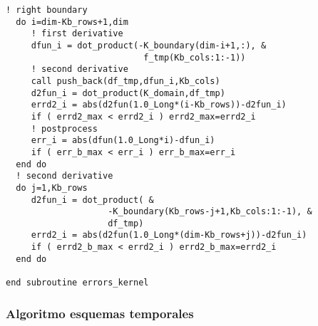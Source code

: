 \documentclass[9pt,technote,twoside,letterpaper,onecolumn]{IEEEtran}
\begin{document}
\begin{multicols}{2}
\begin{lstlisting}[caption={Algoritmo del cálculo de las derivadas},label={lst:opt_alg}]
  ! right boundary
  do i=dim-Kb_rows+1,dim
     ! first derivative
     dfun_i = dot_product(-K_boundary(dim-i+1,:), &
                           f_tmp(Kb_cols:1:-1))
     ! second derivative
     call push_back(df_tmp,dfun_i,Kb_cols)
     d2fun_i = dot_product(K_domain,df_tmp)
     errd2_i = abs(d2fun(1.0_Long*(i-Kb_rows))-d2fun_i)
     if ( errd2_max < errd2_i ) errd2_max=errd2_i
     ! postprocess
     err_i = abs(dfun(1.0_Long*i)-dfun_i)
     if ( err_b_max < err_i ) err_b_max=err_i
  end do
  ! second derivative
  do j=1,Kb_rows
     d2fun_i = dot_product( & 
                    -K_boundary(Kb_rows-j+1,Kb_cols:1:-1), &
                    df_tmp)
     errd2_i = abs(d2fun(1.0_Long*(dim-Kb_rows+j))-d2fun_i)
     if ( errd2_b_max < errd2_i ) errd2_b_max=errd2_i
  end do
    
end subroutine errors_kernel
\end{lstlisting}
\end{multicols}

\subsubsection{Algoritmo esquemas temporales}
\label{sec:dif_conv_trans_alg}
\end{document}

